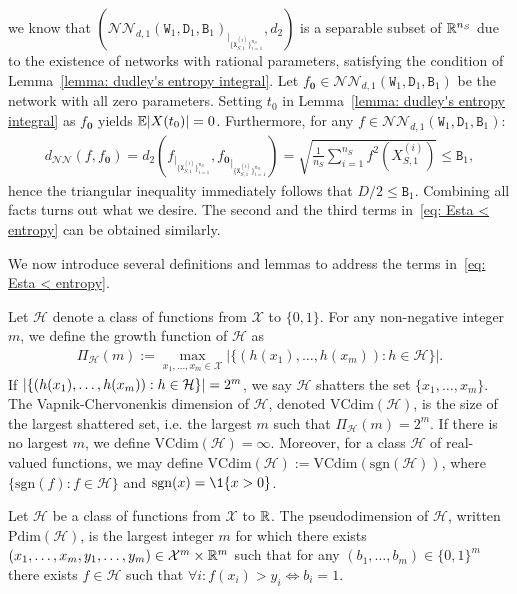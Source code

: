     we know that $(\mathcal{NN}_{d,1}(\mathtt{W}_1, \mathtt{D}_1, \mathtt{B}_1)_{\vert_{\{\mathtt{X}^{(i)}_{S,1}\}_{i=1}^{n_S}}}, d_2)$ is a separable subset of $\mathbb{R}^{n_S}$ due to the existence of networks with rational parameters, satisfying the condition of Lemma~\ref{lemma: dudley's entropy integral}. Let $f_{\bm{0}} \in \mathcal{NN}_{d,1}(\mathtt{W}_1, \mathtt{D}_1, \mathtt{B}_1)$ be the network with all zero parameters. Setting $t_0$ in Lemma~\ref{lemma: dudley's entropy integral} as $f_{\bm{0}}$ yields $\mathbb{E}\vert{X(t_0)}\vert = 0$. Furthermore, for any $f \in \mathcal{NN}_{d,1}(\mathtt{W}_1, \mathtt{D}_1, \mathtt{B}_1)$:
    \begin{align*}
        d_{\mathcal{NN}}(f, f_{\bm{0}}) = d_2(f_{\vert_{\{\mathtt{X}_{S,1}^{(i)}\}_{i=1}^{n_S}}},{f_{\bm{0}}}_{\vert_{\{\mathtt{X}_{S,1}^{(i)}\}_{i=1}^{n_S}}}) = \sqrt{\frac{1}{n_S}\sum_{i=1}^{n_S}f^2(X_{S,1}^{(i)})} \leq \mathtt{B}_1,
    \end{align*}
    hence the triangular inequality immediately follows that $D/2 \leq \mathtt{B}_1$. Combining all facts turns out what we desire. The second and the third terms in~\ref{eq: Esta < entropy} can be obtained similarly.

    We now introduce several definitions and lemmas to address the terms in~\eqref{eq: Esta < entropy}.
    \begin{definition}[VC-dimension] Let $\mathcal{H}$ denote a class of functions from $\mathcal{X}$ to $\{0,1\}$. For any non-negative integer $m$, we define the growth function of $\mathcal{H}$ as
    \begin{align*}
        \Pi_\mathcal{H}(m) := \max_{x_1, \ldots, x_m \in \mathcal{X}}\big\vert\{(h(x_1), \ldots, h(x_m)): h \in \mathcal{H}\} \big\vert.
    \end{align*}
    If $\vert{\{(h(x_1), \ldots, h(x_m)): h \in \mathcal{H}\}}\vert = 2^m$, we say $\mathcal{H}$ shatters the set $\{x_1, \ldots, x_m\}$. The Vapnik-Chervonenkis dimension of $\mathcal{H}$, denoted $\mathrm{VCdim}(\mathcal{H})$, is the size of the largest shattered set, i.e. the largest $m$ such that $\Pi_\mathcal{H}(m) = 2^m$. If there is no largest $m$, we define $\mathrm{VCdim}(\mathcal{H}) = \infty$. Moreover, for a class $\mathcal{H}$ of real-valued functions, we may define $\mathrm{VCdim}(\mathcal{H}):=\mathrm{VCdim}(\mathrm{sgn}(\mathcal{H}))$, where $\{\mathrm{sgn}(f): f \in \mathcal{H}\}$ and $\mathrm{sgn}(x) = \1\{x > 0\}$.
    \end{definition}

    \begin{definition}[pseudodimension]
    Let $\mathcal{H}$ be a class of functions from $\mathcal{X}$ to $\mathbb{R}$. The pseudodimension of $\mathcal{H}$, written $\mathrm{Pdim}(\mathcal{H})$, is the largest integer $m$ for which there exists $(x_1, \ldots, x_m,y_1, \ldots, y_m) \in \mathcal{X}^m \times \mathbb{R}^m$ such that for any $(b_1, \ldots, b_m) \in \{0,1\}^m$ there exists $f \in \mathcal{H}$ such that $\forall i: f(x_i) > y_i \Leftrightarrow b_i = 1$.
    \end{definition}

